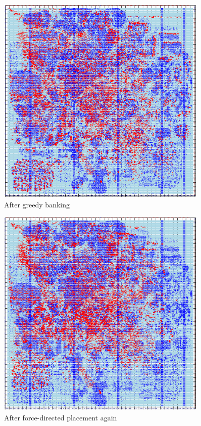\documentclass[12pt]{article}
\begin{document}
\begin{figure}[htbp]
    \centering
    \includegraphics[width=0.9\textwidth]{results/banking.png}
    \caption{After greedy banking}
    \label{fig:banking}
\end{figure}

\begin{figure}[htbp]
    \centering
    \includegraphics[width=0.9\textwidth]{results/force2.png}
    \caption{After force-directed placement again}
    \label{fig:force2}
\end{figure}
\end{document}
